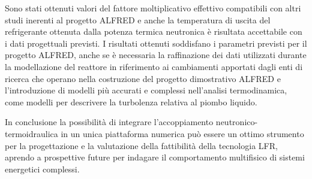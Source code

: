 Sono stati ottenuti valori del fattore moltiplicativo effettivo compatibili con altri studi inerenti al progetto ALFRED e anche la temperatura di uscita del refrigerante ottenuta dalla potenza termica neutronica è risultata accettabile con i dati progettuali previsti.
I risultati ottenuti soddisfano i parametri previsti per il progetto ALFRED, anche se è necessaria la raffinazione dei dati utilizzati durante la modellazione del reattore in riferimento ai cambiamenti apportati dagli enti di ricerca che operano nella costruzione del progetto dimostrativo ALFRED e l'introduzione di modelli più accurati e complessi nell'analisi termodinamica, come modelli per descrivere la turbolenza relativa al piombo liquido.

In conclusione la possibilità di integrare l'accoppiamento neutronico-termoidraulica in un unica piattaforma numerica può essere un ottimo strumento per la progettazione e la valutazione della fattibilità della tecnologia LFR, aprendo a prospettive future per indagare il comportamento multifisico di sistemi energetici complessi. 

















 
